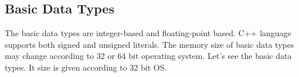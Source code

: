 \documentclass{book}
\begin{document}

\subsection{Basic Data Types}

The basic data types are integer-based and floating-point based. C++ language supports both signed and unsigned literals. 
The memory size of basic data types may change according to 32 or 64 bit operating system. Let's see the basic data types. It size is given according to 32 bit OS.
\end{document}
